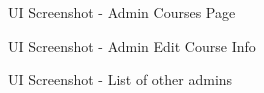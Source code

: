 \begin{figure}[H]
    \centering
    \caption{UI Screenshot - Admin Courses Page}
    \label{fig:ss_a_courses}
\end{figure}

\begin{figure}[H]
    \centering
    \caption{UI Screenshot - Admin Edit Course Info}
    \label{fig:ss_a_courses_edit}
\end{figure}

\begin{figure}[H]
    \centering
    \caption{UI Screenshot - List of other admins}
    \label{fig:ss_a_admins_list}
\end{figure}


